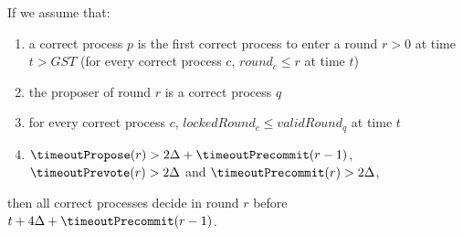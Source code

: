 \begin{lemma} \label{lemma:round-synchronisation} If we assume that:
\begin{enumerate} 
    \item a correct process $p$ is the first correct process to
            enter a round $r>0$ at time $t > GST$ (for every correct process
            $c$, $round_c \le r$ at time $t$) 
    \item the proposer of round $r$ is
            a correct process $q$ 
    \item for every correct process $c$,
            $lockedRound_c \le validRound_q$ at time $t$ 
    \item $\timeoutPropose(r)
        > 2\Delta + \timeoutPrecommit(r-1)$, $\timeoutPrevote(r) > 2\Delta$ and
            $\timeoutPrecommit(r) > 2\Delta$, 
\end{enumerate} 
then all correct processes decide in round $r$ before $t + 4\Delta +
    \timeoutPrecommit(r-1)$.  
\end{lemma}	

